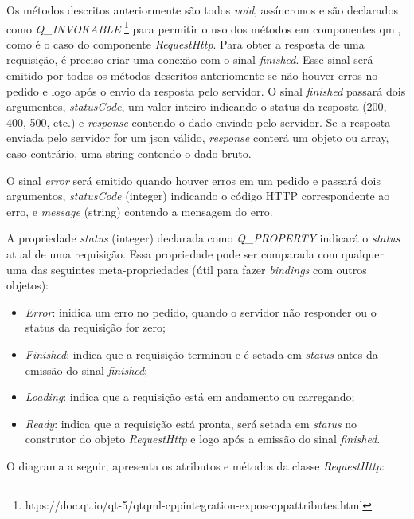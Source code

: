 Os métodos descritos anteriormente são todos \textit{void}, assíncronos e são declarados como \textit{Q\_INVOKABLE} \footnote{htps://doc.qt.io/qt-5/qtqml-cppintegration-exposecppattributes.html} para permitir o uso dos métodos em componentes qml, como é o caso do componente \textit{RequestHttp}. Para obter a resposta de uma requisição, é preciso criar uma conexão com o sinal \textit{finished}. Esse sinal será emitido por todos os métodos descritos anteriomente se não houver erros no pedido e logo após o envio da resposta pelo servidor. O sinal \textit{finished} passará dois argumentos, \textit{statusCode}, um valor inteiro indicando o status da resposta (200, 400, 500, etc.) e \textit{response} contendo o dado enviado pelo servidor. Se a resposta enviada pelo servidor for um json válido, \textit{response} conterá um objeto ou array, caso contrário, uma string contendo o dado bruto.\par

O sinal \textit{error} será emitido quando houver erros em um pedido e passará dois argumentos, \textit{statusCode} (integer) indicando o código HTTP correspondente ao erro, e \textit{message} (string) contendo a mensagem do erro.\par

A propriedade \textit{status} (integer) declarada como \textit{Q\_PROPERTY} indicará o \textit{status} atual de uma requisição. Essa propriedade pode ser comparada com qualquer uma das seguintes meta-propriedades (útil para fazer \textit{bindings} com outros objetos):

\begin{itemize}
	\item \textit{Error}: inidica um erro no pedido, quando o servidor não responder ou o status da requisição for zero;

	\item \textit{Finished}: indica que a requisição terminou e é setada em \textit{status} antes da emissão do sinal \textit{finished};

	\item \textit{Loading}: indica que a requisição está em andamento ou carregando;

	\item \textit{Ready}: indica que a requisição está pronta, será setada em \textit{status} no construtor do objeto \textit{RequestHttp} e logo após a emissão do sinal \textit{finished}.
\end{itemize}

O diagrama a seguir, apresenta os atributos e métodos da classe \textit{RequestHttp}:

